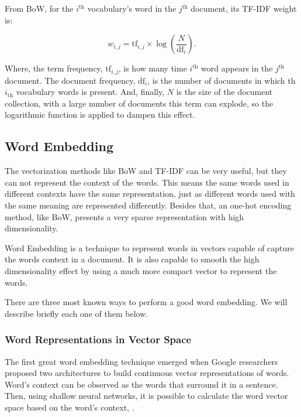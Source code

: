 	From BoW, for the $i^{\text{th}}$ vocabulary's word in the $j^{\text{th}}$ document, its TF-IDF weight is:
	
	\begin{equation}
	\label{eq:tf-idf}
	w_{i, j} = \text{tf}_{i, j} \times \log\left(\dfrac{N}{\text{df}_{i}}\right) \text{.}
	\end{equation}
	
	Where, the term frequency, $\text{tf}_{i, j}$, is how many time $i^{\text{th}}$ word appears in the $j^{\text{th}}$ document. The document frequency, $\text{df}_{i}$, is the number of documents in which th $i_{\text{th}}$ vocabulary words is present. And, finally, $N$ is the size of the document collection, with a large number of documents this term can explode, so the logarithmic function is applied to dampen this effect.
	
	\subsection{Word Embedding}
	
	The vectorization methods like BoW and TF-IDF can be very useful, but they can not represent the context of the words. This means the same words used in different contexts have the same representation, just as different words used with the same meaning are represented differently. Besides that, an one-hot encoding method, like BoW, presents a very sparse representation with high dimensionality. 
	
	Word Embedding is a technique to represent words in vectors capable of capture the words context in a document. It is also capable to smooth the high dimensionality effect by using a much more compact vector to represent the words. 
		
	There are three most known ways to perform a good word embedding. We will describe briefly each one of them below. 
	
	\subsubsection{Word Representations in Vector Space}
	
	The first great word embedding technique emerged when Google researchers proposed two architectures to build continuous vector representations of words. Word's context can be observed as the words that surround it in a sentence. Then, using shallow neural networks, it is possible to calculate the word vector space based on the word's context, \cite{mikolov2013efficient}.
	
